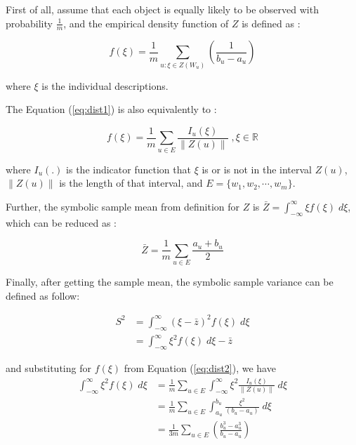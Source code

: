 \documentclass[article]{jss}
\begin{document}
First of all, assume that each object is equally likely to be observed with probability $\frac{1}{m}$, and the empirical density function of $Z$ is defined as : 

\begin{equation}\label{eq:dist1}
f(\xi) = \frac{1}{m} \sum_{u:\xi \in Z(W_u)}(\frac{1}{b_u-a_u})
\end{equation}

where $\xi$ is the individual descriptions.


The Equation (\ref{eq:dist1}) is also equivalently to :

\begin{equation}\label{eq:dist2}
f(\xi) = \frac{1}{m}\sum_{u \in E}\frac{I_u(\xi)}{\| Z(u) \|}\;,\xi \in \mathbb{R}
\end{equation}

where $I_u(.)$ is the indicator function that $\xi$ is or is not in the interval $Z(u)$, $\| Z(u) \|$ is the length of that interval, and $E=\{w_1,w_2,\cdots,w_m \}$.

Further, the symbolic sample mean from definition for $Z$ is $\bar{Z} = \int_{-\infty}^{\infty} \xi f(\xi)\;d\xi$, which can be reduced as :

\begin{equation}\label{eq:mean}
\bar{Z}=\frac{1}{m}\sum_{u \in E}\frac{a_u+b_u}{2}
\end{equation}

Finally, after getting the sample mean, the symbolic sample variance can be defined as follow:

\begin{equation}\label{eq:varDef}
\begin{split}
S^2 & = \int_{-\infty}^{\infty} (\xi - \bar{z})^2f(\xi)\;d\xi \\
 & = \int_{-\infty}^{\infty} \xi^2f(\xi)\;d\xi-\bar{z}
\end{split}
\end{equation}

and substituting for $f(\xi)$ from Equation (\ref{eq:dist2}), we have 
\begin{equation}\label{eq:derived}
\begin{split}
\int_{-\infty}^{\infty} \xi^2f(\xi)\;d\xi &= \frac{1}{m}\sum_{u \in E}\int_{-\infty}^{\infty} \xi^2 \frac{I_u(\xi)}{\| Z(u) \|}\;d\xi \\
&= \frac{1}{m}\sum_{u \in E} \int_{a_u}^{b_u} \frac{\xi^2}{(b_u-a_u)}\;d\xi \\
&= \frac{1}{3m} \sum_{u \in E}(\frac{b_u^3 - a_u^3}{b_u-a_u})
\end{split}
\end{equation}
\end{document}
